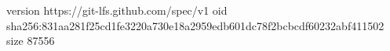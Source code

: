 version https://git-lfs.github.com/spec/v1
oid sha256:831aa281f25cd1fe3220a730e18a2959edb601dc78f2bcbcdf60232abf411502
size 87556
